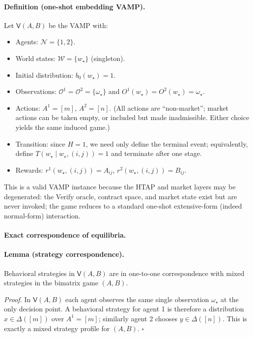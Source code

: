\paragraph{Definition (one-shot embedding VAMP).}
Let \(\mathsf V(A,B)\) be the VAMP with:
\begin{itemize}
\item Agents: \(\mathcal N=\{1,2\}\).
\item World states: \(\mathcal W=\{w_\star\}\) (singleton).
\item Initial distribution: \(b_0(w_\star)=1\).
\item Observations: \(\mathcal O^1=\mathcal O^2=\{\omega_\star\}\) and \(O^1(w_\star)=O^2(w_\star)=\omega_\star\).
\item Actions: \(A^1=[m]\), \(A^2=[n]\). (All actions are ``non-market''; market actions can be taken empty, or included but made inadmissible. Either choice yields the same induced game.)
\item Transition: since \(H=1\), we need only define the terminal event; equivalently, define \(T(w_\star\mid w_\star,(i,j))=1\) and terminate after one stage.
\item Rewards: \(r^1(w_\star,(i,j))=A_{ij}\), \(r^2(w_\star,(i,j))=B_{ij}\).
\end{itemize}

This is a valid VAMP instance because the HTAP and market layers may be degenerated: the Verify oracle, contract space, and market state exist but are never invoked; the game reduces to a standard one-shot extensive-form (indeed normal-form) interaction.

\paragraph{Exact correspondence of equilibria.}

\paragraph{Lemma (strategy correspondence).}
Behavioral strategies in \(\mathsf V(A,B)\) are in one-to-one correspondence with mixed strategies in the bimatrix game \((A,B)\).

\emph{Proof.} In \(\mathsf V(A,B)\) each agent observes the same single observation \(\omega_\star\) at the only decision point. A behavioral strategy for agent 1 is therefore a distribution \(x\in\Delta([m])\) over \(A^1=[m]\); similarly agent 2 chooses \(y\in\Delta([n])\). This is exactly a mixed strategy profile for \((A,B)\). \(\square\)

